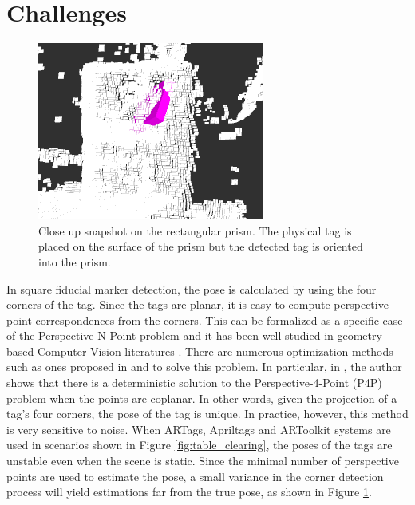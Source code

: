 \section{Challenges}
\label{sec:problem}

\begin{figure}
\centering
\includegraphics[width=\columnwidth]{figs/mismatch_tag}
\caption{Close up snapshot on the rectangular prism. The physical tag is placed on the surface of the prism but the detected tag is oriented into the prism.}
\label{fig:mismatch}
\end{figure}
In square fiducial marker detection, the pose is calculated by using the four corners of the tag. Since the tags are planar, it is easy to compute perspective point correspondences from the corners. This can be formalized as a specific case of the Perspective-N-Point problem and it has been well studied in geometry based Computer Vision literatures \citep{hartley2003multiple, zhang2005general}. There are numerous optimization methods such as ones proposed in \citep{dementhon1992exact} and \citep{haralick1994review} to solve this problem. In particular, in \citep{horaud1989analytic}, the author shows that there is a deterministic solution to the Perspective-4-Point (P4P) problem when the points are coplanar. In other words, given the projection of a tag's four corners, the pose of the tag is unique. In practice, however, this method is very sensitive to noise. When ARTags, Apriltags and ARToolkit systems are used in scenarios shown in Figure \ref{fig:table_clearing}, the poses of the tags are unstable even when the scene is static. Since the minimal number of perspective points are used to estimate the pose, a small variance in the corner detection process will yield estimations far from the true pose, as shown in Figure \ref{fig:mismatch}.

